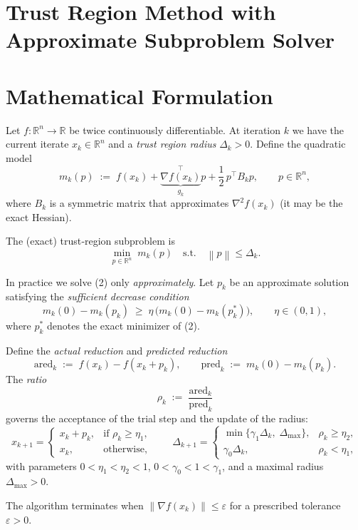\documentclass{article}
\newcommand{\norm}[1]{\left\lVert#1\right\rVert}
\newcommand{\RR}{\mathbb{R}}
\begin{document}
\section*{Trust Region Method with Approximate Subproblem Solver}

\section*{Mathematical Formulation}
Let $f:\RR^{n}\rightarrow\RR$ be twice continuously differentiable.  
At iteration $k$ we have the current iterate $x_{k}\in\RR^{n}$ and a \emph{trust region radius} $\Delta_{k}>0$.  
Define the quadratic model
\[
m_{k}(p)\;:=\;f(x_{k})+\underbrace{\nabla f(x_{k})}_{g_{k}}^{\!\!\top}p
+\frac12\,p^{\top}B_{k}p,\qquad p\in\RR^{n},
\tag{1}
\]
where $B_{k}$ is a symmetric matrix that approximates $\nabla^{2}f(x_{k})$ (it may be the exact Hessian).

The (exact) trust‑region subproblem is
\[
\min_{p\in\RR^{n}}\; m_{k}(p)\quad\text{s.t.}\quad \norm{p}\le\Delta_{k}.
\tag{2}
\]

In practice we solve (2) only \emph{approximately}.  
Let $p_{k}$ be an approximate solution satisfying the \emph{sufficient decrease condition}
\[
m_{k}(0)-m_{k}(p_{k})\;\ge\;\eta\,
\bigl(m_{k}(0)-m_{k}(p_{k}^{*})\bigr),\qquad 
\eta\in(0,1),
\tag{3}
\]
where $p_{k}^{*}$ denotes the exact minimizer of (2).

Define the \emph{actual reduction} and \emph{predicted reduction}
\[
\text{ared}_{k}\;:=\;f(x_{k})-f(x_{k}+p_{k}),\qquad
\text{pred}_{k}\;:=\;m_{k}(0)-m_{k}(p_{k}).
\tag{4}
\]
The \emph{ratio}
\[
\rho_{k}\;:=\;\frac{\text{ared}_{k}}{\text{pred}_{k}}
\tag{5}
\]
governs the acceptance of the trial step and the update of the radius:
\[
x_{k+1}= 
\begin{cases}
x_{k}+p_{k}, & \text{if }\rho_{k}\ge\eta_{1},\\[4pt]
x_{k}, & \text{otherwise},
\end{cases}
\qquad
\Delta_{k+1}= 
\begin{cases}
\displaystyle\min\{\gamma_{1}\Delta_{k},\;\Delta_{\max}\},
& \rho_{k}\ge\eta_{2},\\[8pt]
\displaystyle\gamma_{0}\Delta_{k},
& \rho_{k}<\eta_{1},
\end{cases}
\tag{6}
\]
with parameters $0<\eta_{1}<\eta_{2}<1$, $0<\gamma_{0}<1<\gamma_{1}$, and a maximal radius $\Delta_{\max}>0$.

The algorithm terminates when $\norm{\nabla f(x_{k})}\le\varepsilon$ for a prescribed tolerance $\varepsilon>0$.
\end{document}

